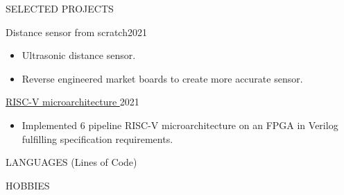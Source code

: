\documentclass{resume}
\begin{document}
\begin{minipage}[t]{0.54\textwidth}
\begin{rsection}{\MakeUppercase{selected projects}}
\begin{rcontent}{Distance sensor from scratch}{2021}{}
\begin{techtag}
			\item {}
		\end{techtag}
			\begin{itemize}
				\item Ultrasonic distance sensor.
				\item Reverse engineered market boards to create more accurate sensor.
			\end{itemize}
		\end{rcontent}
		\divider
		\begin{rcontent}{\href{https://github.com/solomspd/RISC-V-CPU}{RISC-V microarchitecture \hspace{0.25em} \iconin{\faGithub}}}{2021}{}
		\begin{techtag}
			\item {}
			\item {}
			\item {}
		\end{techtag}
			\begin{itemize}
				\item Implemented 6 pipeline RISC-V microarchitecture on an FPGA in Verilog fulfilling specification requirements.
			\end{itemize}
		\end{rcontent}

	\end{rsection}

	\begin{rfloat}{\MakeUppercase{languages} (Lines of Code)}
		\begin{techlist}
			\item {}
			\item {}
			\item {}
			\item {}
			\item {}
			\item {}
			\item {}
			\item {}
			\item {}
			\item {}
			\item {}
		\end{techlist}
	\end{rfloat}

	\begin{rsection}{\MakeUppercase{hobbies}}


\end{rsection}
\end{minipage}
\end{document}
